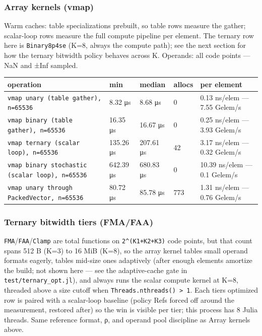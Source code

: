 \subsubsection{Array kernels (vmap)}



\label{14819160431636425252}{}


Warm caches: table specializations prebuilt, so table rows measure the gather; scalar-loop rows measure the full compute pipeline per element. The ternary row here is \texttt{Binary8p4se} (K=8, always the compute path); see the next section for how the ternary bitwidth policy behaves across K. Operands: all code points — NaN and ±Inf sampled.




\begin{table}[h]
\centering
\begin{tabulary}{\linewidth}{L L L L L}
\toprule
operation & min & median & allocs & per element \\
\toprule
\texttt{vmap unary (\allowbreak{}table gather), n=65536} & 8.32 μs & 8.68 μs & 0 & 0.13 ns/elem — 7.55 Gelem/s \\
\texttt{vmap binary (\allowbreak{}table gather), n=65536} & 16.35 μs & 16.67 μs & 0 & 0.25 ns/elem — 3.93 Gelem/s \\
\texttt{vmap ternary (\allowbreak{}scalar loop), n=65536} & 135.26 μs & 207.61 μs & 42 & 3.17 ns/elem — 0.32 Gelem/s \\
\texttt{vmap binary stochastic (\allowbreak{}scalar loop), n=65536} & 642.39 μs & 680.83 μs & 0 & 10.39 ns/elem — 0.1 Gelem/s \\
\texttt{vmap unary through PackedVector, n=65536} & 80.72 μs & 85.78 μs & 773 & 1.31 ns/elem — 0.76 Gelem/s \\
\bottomrule
\end{tabulary}

\end{table}



\subsubsection{Ternary bitwidth tiers (FMA/FAA)}



\label{14443973703327008650}{}


\texttt{FMA}/\allowbreak\texttt{FAA}/\texttt{Clamp} are total functions on \texttt{2{\textasciicircum}(K1+K2+K3)} code points, but that count spans 512 B (K=3) to 16 MiB (K=8), so the array kernel tables small operand formats eagerly, tables mid-size ones adaptively (after enough elements amortize the build; not shown here — see the adaptive-cache gate in \texttt{test/ternary\_\allowbreak{}opt.jl}), and always runs the scalar compute kernel at K=8, threaded above a size cutoff when \texttt{Threads.nthreads() > 1}. Each tier{\textquotesingle}s optimized row is paired with a scalar-loop baseline (policy Refs forced off around the measurement, restored after) so the win is visible per tier; this process has 8 Julia threads. Same reference format, ρ, and operand pool discipline as Array kernels above.




